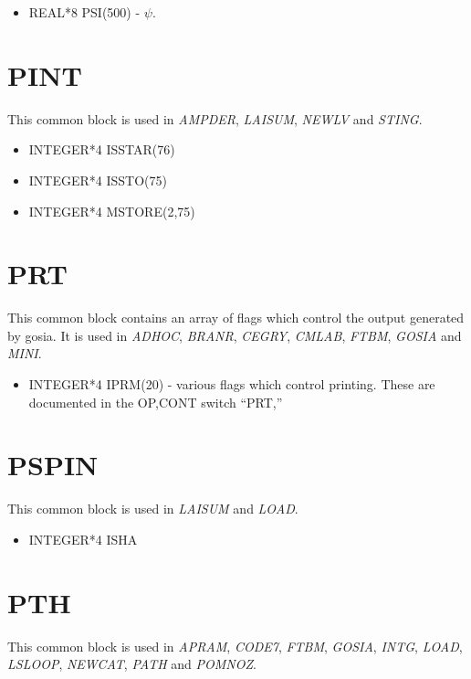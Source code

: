 \begin{itemize}
\item REAL*8 PSI(500) - $\psi$.
\end{itemize}

\section{PINT}

This common block is used in {\em AMPDER}, {\em LAISUM}, {\em NEWLV} and
{\em STING}.

\begin{itemize}
\item INTEGER*4 ISSTAR(76)
\item INTEGER*4 ISSTO(75)
\item INTEGER*4 MSTORE(2,75)
\end{itemize}

\section{PRT}

This common block contains an array of flags which control the output
generated by gosia. It is used in {\em ADHOC}, {\em BRANR}, {\em CEGRY},
{\em CMLAB}, {\em FTBM}, {\em GOSIA} and {\em MINI}.

\begin{itemize}
\item INTEGER*4 IPRM(20) - various flags which control printing. These are
documented in the OP,CONT switch ``PRT,''
\end{itemize}

\section{PSPIN}

This common block is used in {\em LAISUM} and {\em LOAD}.

\begin{itemize}
\item INTEGER*4 ISHA
\end{itemize}

\section{PTH}

This common block is used in {\em APRAM}, {\em CODE7}, {\em FTBM}, {\em
GOSIA}, {\em INTG}, {\em LOAD}, {\em LSLOOP}, {\em NEWCAT}, {\em PATH} and
{\em POMNOZ}.


